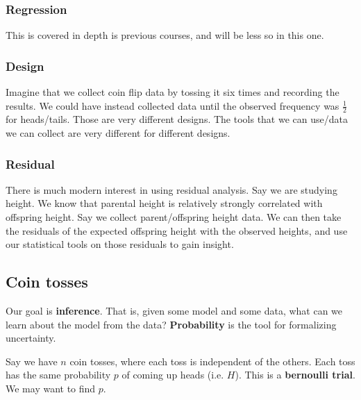 \documentclass[titlepage, 12pt, leqno]{article}
\begin{document}
\subsubsection{Regression}
This is covered in depth is previous courses, and will be less so in this one.

\subsubsection{Design}
Imagine that we collect coin flip data by tossing it six times and recording 
the results. We could have instead collected data until the observed frequency
was $\frac{1}{2}$ for heads/tails. Those are very different designs. The
tools that we can use/data we can collect are very different for different
designs.

\pagebreak

\subsubsection{Residual}
There is much modern interest in using residual analysis. Say we are studying
height. We know that parental height is relatively strongly correlated with
offspring height. Say we collect parent/offspring height data. We can then
take the residuals of the expected offspring height with the observed heights,
and use our statistical tools on those residuals to gain insight.

\subsection{Coin tosses}
Our goal is \textbf{inference}. That is, given some model and some data, what
can we learn about the model from the data? \textbf{Probability} is the tool
for formalizing uncertainty.

\begin{ex}
    Say we have $n$ coin tosses, where each toss is independent of the others.
    Each toss has the same probability $p$ of coming up heads (i.e. $H$). This 
    is a \textbf{bernoulli trial}. We may want to find $p$.
\end{ex}
\end{document}
